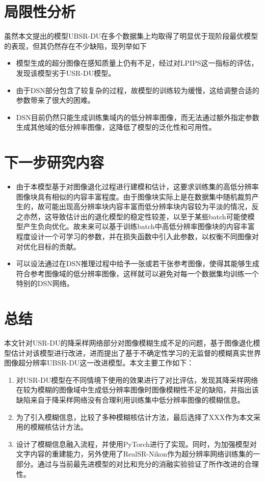 \section{局限性分析}
虽然本文提出的模型UBSR-DU在多个数据集上均取得了明显优于现阶段最优模型的表现，但其仍然存在不少缺陷，现列举如下
\begin{itemize}
    \item 模型生成的超分图像在感知质量上仍有不足，经过对LPIPS这一指标的评估，发现该模型劣于USR-DU模型。
    \item 由于DSN部分包含了较复杂的过程，故模型的训练较为缓慢，这给调整合适的参数带来了很大的困难。
    \item DSN目前仍然只能生成训练集域内的低分辨率图像，而无法通过额外指定参数生成其他域的低分辨率图像，这降低了模型的泛化性和可用性。
\end{itemize}
\section{下一步研究内容}
\begin{itemize}
    \item 由于本模型基于对图像退化过程进行建模和估计，这要求训练集的高低分辨率图像块具有相似的内容丰富程度。由于图像块实际上是在数据集中随机裁剪产生的，故可能出现高分辨率块内容丰富而低分辨率块内容较为平淡的情况，反之亦然，这导致估计出的退化模型的稳定性较差，以至于某些batch可能使模型产生负向优化。故未来可以基于训练batch中高低分辨率图像块的内容丰富程度设计一个可学习的参数，并在损失函数中引入此参数，以权衡不同图像对对优化目标的贡献。
    \item 可以设法通过在DSN推理过程中给予一张或若干张参考图像，使得其能够生成符合参考图像域的低分辨率图像，这样就可以避免对每一个数据集均训练一个特别的DSN网络。
\end{itemize}
\section{总结}
本文针对USR-DU的降采样网络部分对图像模糊生成不足的问题，基于图像退化模型估计对该模型进行改进，进而提出了基于不确定性学习的无监督的模糊真实世界图像超分辨率UBSR-DU这一改进模型。本文主要工作如下：
\begin{enumerate}
    \item 对USR-DU模型在不同情境下使用的效果进行了对比评估，发现其降采样网络在较为模糊的图像域中生成低分辨率图像时图像模糊性不足的缺陷，并指出该缺陷来自于降采样网络没有合理利用训练集中低分辨率图像的模糊信息。
    \item 为了引入模糊信息，比较了多种模糊核估计方法，最后选择了XXX作为本文采用的模糊核估计方法。
    \item 设计了模糊信息融入流程，并使用PyTorch进行了实现。同时，为加强模型对文字内容的重建能力，另外使用了RealSR-Nikon作为超分辨率网络训练集的一部分。通过与当前最先进模型的对比和充分的消融实验验证了所作改进的合理性。
\end{enumerate}